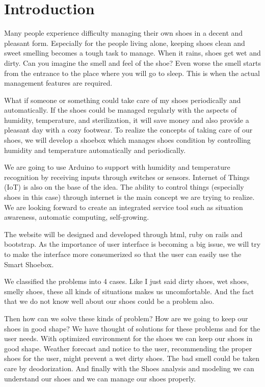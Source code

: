 \documentclass[conference]{IEEEtran}
\begin{document}
\section{Introduction}
Many people experience difficulty managing their own shoes in a decent and pleasant form. Especially for the people living alone, keeping shoes clean and sweet smelling becomes a tough task to manage. When it rains, shoes get wet and dirty. Can you imagine the smell and feel of the shoe? Even worse the smell starts from the entrance to the place where you will go to sleep. This is when the actual management features are required.

What if someone or something could take care of my shoes periodically and automatically. If the shoes could be managed regularly with the aspects of humidity, temperature, and sterilization, it will save money and also provide a pleasant day with a cozy footwear. To realize the concepts of taking care of our shoes, we will develop a shoebox which manages shoes condition by controlling humidity and temperature automatically and periodically. 

We are going to use Arduino to support with humidity and temperature recognition by receiving inputs through switches or sensors. Internet of Things (IoT) is also on the base of the idea. The ability to control things (especially shoes in this case) through internet is the main concept we are trying to realize. We are looking forward to create an integrated service tool such as situation awareness, automatic computing, self-growing. 

The website will be designed and developed through html, ruby on rails and bootstrap. As the importance of user interface is becoming a big issue, we will try to make the interface more consumerized so that the user can easily use the Smart Shoebox.

We classified the problems into 4 cases. Like I just said dirty shoes, wet shoes, smelly shoes, these all kinds of situations makes us uncomfortable. And the fact that we do not know well about our shoes could be a problem also. 

Then how can we solve these kinds of problem? How are we going to keep our shoes in good shape?
We have thought of solutions for these problems and for the user needs. With optimized environment for the shoes we can keep our shoes in good shape. Weather forecast and notice to the user, recommending the proper shoes for the user, might prevent a wet dirty shoes. The bad smell could be taken care by deodorization. And finally with the Shoes analysis and modeling we can understand our shoes and we can manage our shoes properly.
\end{document}
